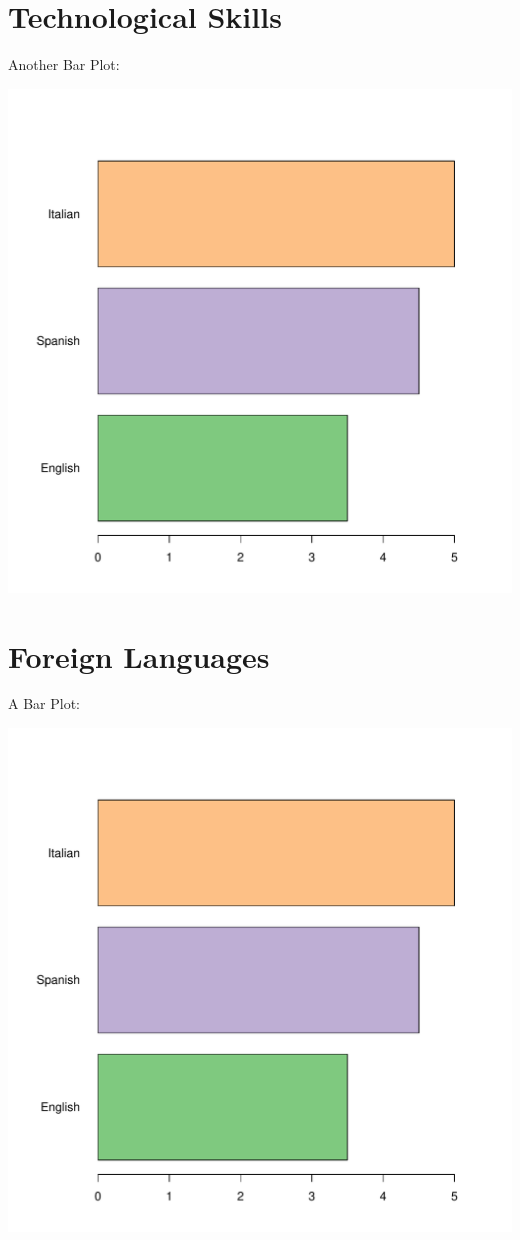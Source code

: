 \documentclass[10pt,a4paper]{article}
\begin{document}
\section{Technological Skills}
Another Bar Plot:

\includegraphics[page=2]{Rplots.pdf}
\newpage


\section{Foreign Languages}
A Bar Plot:

\includegraphics[page=1]{Rplots.pdf}
\newpage
\end{document}
